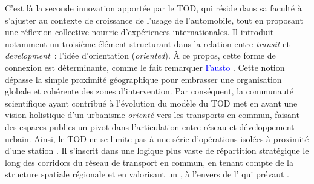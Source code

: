 \begin{refsegment}
C'est là la seconde innovation apportée par le \acrshort{TOD}, qui réside dans sa faculté à s’ajuster au contexte de croissance de l’usage de l’automobile, tout en proposant une réflexion collective nourrie d’expériences internationales. Il introduit notamment un troisième élément structurant dans la relation entre \textsl{transit} et \textsl{development}~: l'idée d'orientation (\textsl{oriented}). À ce propos, cette forme de connexion est déterminante, comme le fait remarquer \textcolor{blue}{Fausto} \textcolor{blue}{\textcite[116]{lo_feudo_scenario_2014}}. Cette notion dépasse la simple proximité géographique pour embrasser une organisation globale et cohérente des zones d’intervention. Par conséquent, la communauté scientifique ayant contribué à l'évolution du modèle du \acrshort{TOD} met en avant une vision holistique d'un urbanisme \textsl{orienté} vers les transports en commun, faisant des espaces publics un pivot dans l'articulation entre réseau et développement urbain. Ainsi, le \acrshort{TOD} ne se limite pas à une série d'opérations isolées à proximité d'une station \textcolor{blue}{\autocite[124]{lhostis_ville_2013}}. Il s’inscrit dans une logique plus vaste de répartition stratégique le long des corridors du réseau de transport en commun, en tenant compte de la structure spatiale régionale et en valorisant un , à l'envers de l' qui prévaut \textcolor{blue}{\autocite[4-6]{mangin_ville_2004}}.%


\end{refsegment}
